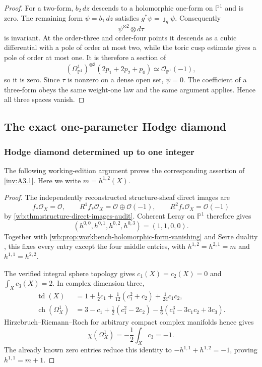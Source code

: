 \begin{proof}
For a two-form, $b_2\,dz$ descends to a holomorphic one-form on
$\mathbb P^1$ and is zero.  The remaining form
$\psi=b_1\,dz$ satisfies $g^*\psi=\jmath_g\psi$.  Consequently
\[
 \psi^{\otimes2}\otimes d\tau
\]
is invariant.  At the order-three and order-four points it descends as a
cubic differential with a pole of order at most two, while the toric cusp
estimate gives a pole of order at most one.  It is therefore a section of
\[
 (\Omega^1_{\mathbb P^1})^{\otimes3}
 (2p_1+2p_2+p_0)\simeq\mathcal O_{\mathbb P^1}(-1),
\]
so it is zero.  Since $\dot\tau$ is nonzero on a dense open set,
$\psi=0$.  The coefficient of a three-form obeys the same weight-one law
and the same argument applies.  Hence all three spaces vanish.
\end{proof}

\subsection{The exact one-parameter Hodge diamond}

\subsubsection{Hodge diamond determined up to one integer}\label{inv:wbproof:thm:parametric-hodge-diamond}
The following working-edition argument proves the corresponding assertion of \cref{inv:A3.1}.
Here we write $m=h^{1,2}(X)$.


\begin{proof}
The independently reconstructed structure-sheaf direct images are
\[
 f_*\mathcal O_X=\mathcal O,
 \qquad R^1f_*\mathcal O_X=\mathcal O\oplus\mathcal O(-1),
 \qquad R^2f_*\mathcal O_X=\mathcal O(-1)
\]
by \cref{wb:thm:structure-direct-images-audit}.  Coherent Leray on
$\mathbb P^1$ therefore gives
\[
 (h^{0,0},h^{0,1},h^{0,2},h^{0,3})=(1,1,0,0).
\]
Together with \cref{wb:prop:workbench-holomorphic-form-vanishing} and Serre
duality \cite[\S13, Theorem~4, p.~22]{Serre1955Duality}, this fixes every
entry except the four middle entries, with
$h^{1,2}=h^{2,1}=m$ and $h^{1,1}=h^{2,2}$.

The verified integral sphere topology gives $c_1(X)=c_2(X)=0$ and
$\int_Xc_3(X)=2$.  In complex dimension three,
\begin{align*}
 \operatorname{td}(X)
 &=1+\frac12c_1+\frac1{12}(c_1^2+c_2)+\frac1{24}c_1c_2,\\
 \operatorname{ch}(\Omega_X^1)
 &=3-c_1+\frac12(c_1^2-2c_2)
   -\frac16(c_1^3-3c_1c_2+3c_3).
\end{align*}
Hirzebruch--Riemann--Roch for arbitrary compact complex manifolds
\cite[Theorem~3, p.~427]{AtiyahSinger1963} hence gives
\[
 \chi(\Omega_X^1)=-\frac12\int_Xc_3=-1.
\]
The already known zero entries reduce this identity to
$-h^{1,1}+h^{1,2}=-1$, proving $h^{1,1}=m+1$.
\end{proof}

